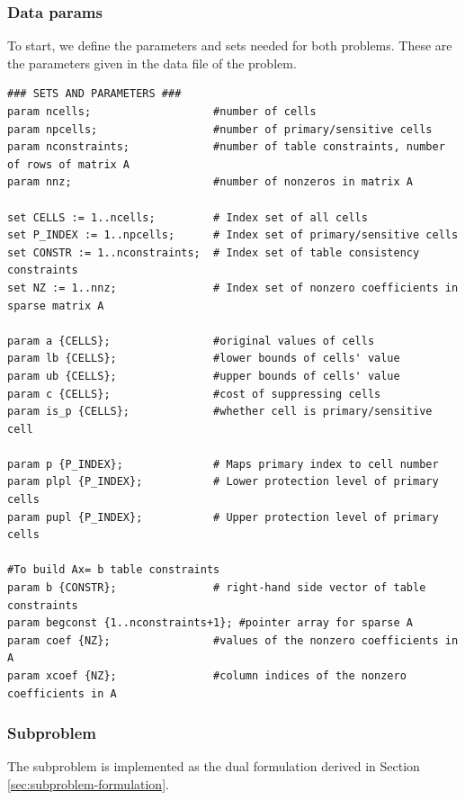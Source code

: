 \documentclass[11pt,a4paper]{article}
\begin{document}
\subsubsection{Data params}
To start, we define the parameters and sets needed for both problems. These are the parameters given in the data file of the problem.
\begin{lstlisting}
### SETS AND PARAMETERS ###
param ncells;					#number of cells
param npcells;					#number of primary/sensitive cells
param nconstraints;				#number of table constraints, number of rows of matrix A
param nnz;						#number of nonzeros in matrix A

set CELLS := 1..ncells;			# Index set of all cells
set P_INDEX := 1..npcells; 		# Index set of primary/sensitive cells
set CONSTR := 1..nconstraints;	# Index set of table consistency constraints
set NZ := 1..nnz;				# Index set of nonzero coefficients in sparse matrix A

param a {CELLS};				#original values of cells
param lb {CELLS};				#lower bounds of cells' value
param ub {CELLS};				#upper bounds of cells' value
param c {CELLS};				#cost of suppressing cells
param is_p {CELLS};				#whether cell is primary/sensitive cell

param p {P_INDEX};      		# Maps primary index to cell number
param plpl {P_INDEX};  		 	# Lower protection level of primary cells
param pupl {P_INDEX};   		# Upper protection level of primary cells

#To build Ax= b table constraints
param b {CONSTR};				# right-hand side vector of table constraints 
param begconst {1..nconstraints+1}; #pointer array for sparse A
param coef {NZ};				#values of the nonzero coefficients in A
param xcoef {NZ};				#column indices of the nonzero coefficients in A

\end{lstlisting}

\subsubsection{Subproblem}
The subproblem is implemented as the dual formulation derived in Section \ref{sec:subproblem-formulation}.
\end{document}

